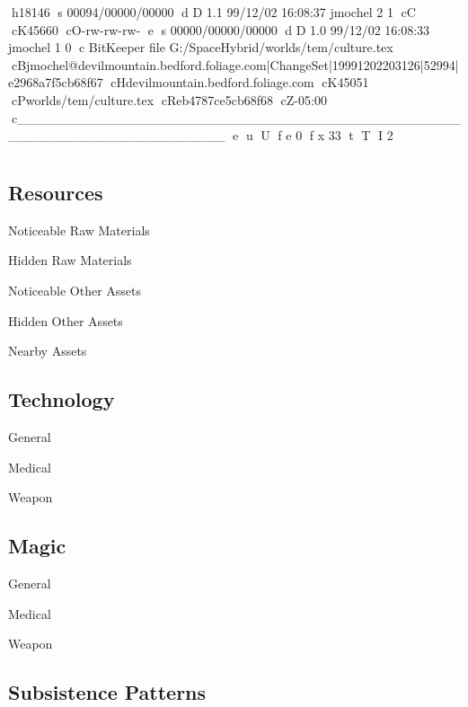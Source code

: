 h18146
s 00094/00000/00000
d D 1.1 99/12/02 16:08:37 jmochel 2 1
cC
cK45660
cO-rw-rw-rw-
e
s 00000/00000/00000
d D 1.0 99/12/02 16:08:33 jmochel 1 0
c BitKeeper file G:/SpaceHybrid/worlds/tem/culture.tex
cBjmochel@devilmountain.bedford.foliage.com|ChangeSet|19991202203126|52994|e2968a7f5cb68f67
cHdevilmountain.bedford.foliage.com
cK45051
cPworlds/tem/culture.tex
cReb4787ce5cb68f68
cZ-05:00
c______________________________________________________________________
e
u
U
f e 0
f x 33
t
T
I 2
\chapter{}

\section{Resources}

\begin{relate}
	\item[Noticeable Raw Materials]
	\item[Hidden Raw Materials]
	\item[Noticeable Other Assets]
	\item[Hidden Other Assets]
	\item[Nearby Assets]
\end{relate}

\section{Technology}
\begin{relate}
	\item[General]
	\item[Medical]
	\item[Weapon]
\end{relate}

\section{Magic}
\begin{relate}
	\item[General]
	\item[Medical]
	\item[Weapon]
\end{relate}

\section{Subsistence Patterns}

